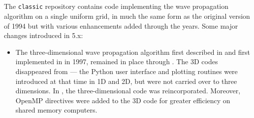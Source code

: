%
%
%

\subsection{\classic}
The \texttt{classic} repository contains code implementing the wave
propagation algorithm on a single uniform grid, in much the same form as the
original  version of 1994 but with various enhancements added
through the years.  Some major changes introduced in \clawpack 5.x:
\begin{itemize}
    \item The three-dimensional wave propagation algorithm first described
in \cite{jol:thesis, jol-rjl:3d} 
and first implemented in  in 1997, remained in place through
.  The 3D codes 
disappeared from  --- the Python user interface and plotting
routines were introduced at that time in 1D and 2D, but were not 
carried over to three dimensions.  In , the three-dimensional
code was reincorporated.  Moreover, OpenMP directives were added to the 3D code
for greater efficiency on shared memory computers.


\end{itemize}
